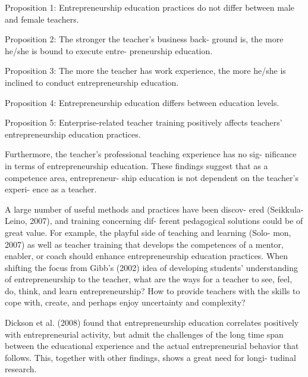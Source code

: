 Proposition 1: Entrepreneurship education practices do not differ between male and female teachers.


Proposition 2: The stronger the teacher’s business back- ground is, the more he/she is bound to execute entre- preneurship education.

Proposition 3: The more the teacher has work experience, the more he/she is inclined to conduct entrepreneurship education.

Proposition 4: Entrepreneurship education differs between education levels.

Proposition 5: Enterprise-related teacher training positively affects teachers’ entrepreneurship education practices.

Furthermore, the teacher’s professional teaching experience has no sig- nificance in terms of entrepreneurship education. These findings suggest that as a competence area, entrepreneur- ship education is not dependent on the teacher’s experi- ence as a teacher.


A large number of useful methods and practices have been discov- ered (Seikkula-Leino, 2007), and training concerning dif- ferent pedagogical solutions could be of great value. For example, the playful side of teaching and learning (Solo- mon, 2007) as well as teacher training that develops the competences of a mentor, enabler, or coach should enhance entrepreneurship education practices. When shifting the focus from Gibb’s (2002) idea of developing students’ understanding of entrepreneurship to the teacher, what are the ways for a teacher to see, feel, do, think, and learn entrepreneurship? How to provide teachers with the skills to cope with, create, and perhaps enjoy uncertainty and complexity?

Dickson et al. (2008) found that entrepreneurship education correlates positively with entrepreneurial activity, but admit the challenges of the long time span between the educational experience and the actual entrepreneurial behavior that follows. This, together with other findings, shows a great need for longi- tudinal research.

